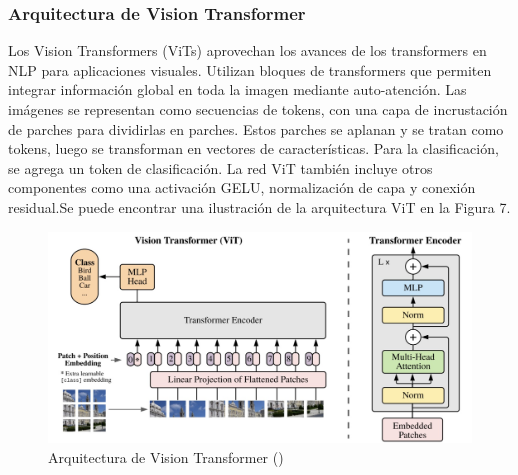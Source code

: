 \subsubsection{ Arquitectura de Vision Transformer}
Los Vision Transformers (ViTs) aprovechan los avances de los transformers en NLP para aplicaciones visuales. Utilizan bloques de transformers que permiten integrar información global en toda la imagen mediante auto-atención. Las imágenes se representan como secuencias de tokens, con una capa de incrustación de parches para dividirlas en parches. Estos parches se aplanan y se tratan como tokens, luego se transforman en vectores de características. Para la clasificación, se agrega un token de clasificación. La red ViT también incluye otros componentes como una activación GELU, normalización de capa y conexión residual.Se puede encontrar una ilustración de la arquitectura ViT en la Figura 7.
\begin{figure}[H]
	\begin{center}
		\includegraphics[width=1\textwidth]{2/figures/vt1.jpeg}
		\caption{Arquitectura de Vision Transformer (\cite{tecnica1})}
	\end{center}
\end{figure}

